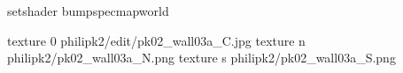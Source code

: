 setshader bumpspecmapworld

texture 0 philipk2/edit/pk02_wall03a_C.jpg
texture n philipk2/pk02_wall03a_N.png
texture s philipk2/pk02_wall03a_S.png

